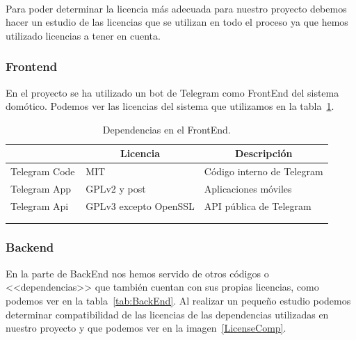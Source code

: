 \begin{displayquote}
~\cite{misc:WikiLicencia}
\end{displayquote}

Para poder determinar la licencia más adecuada para nuestro proyecto debemos hacer un estudio de las licencias que se utilizan en todo el proceso ya que hemos utilizado licencias a tener en cuenta.

\subsubsection{Frontend}
En el proyecto se ha utilizado un bot de Telegram como FrontEnd del sistema domótico. Podemos ver las licencias del sistema que utilizamos en la tabla~\ref{tab:FrontEnd}.

\begin{longtable}[c]{@{}lll@{}}
\toprule
\centering
\multicolumn{1}{c}{\textbf{Nombre}} & \multicolumn{1}{c}{\textbf{Licencia}} & \multicolumn{1}{c}{\textbf{Descripción}} \\ \midrule
\endfirsthead
%
\endhead
%
\bottomrule
\endfoot
%
\endlastfoot
%
Telegram Code & MIT & Código interno de Telegram \\
Telegram App~\cite{misc:TelegramApp} & GPLv2 y post & Aplicaciones móviles \\
Telegram Api~\cite{misc:TelegramApi} & GPLv3 excepto OpenSSL & API pública de Telegram \\ \bottomrule \\
\caption{Dependencias en el FrontEnd.}
\label{tab:FrontEnd}
\end{longtable}

\subsubsection{Backend}
En la parte de BackEnd nos hemos servido de otros códigos o <<dependencias>> que también cuentan con sus propias licencias, como podemos ver en la tabla~\ref{tab:BackEnd}. Al realizar un pequeño estudio podemos determinar compatibilidad de las licencias de las dependencias utilizadas en nuestro proyecto y que podemos ver en la imagen~\ref{LicenseComp}.

